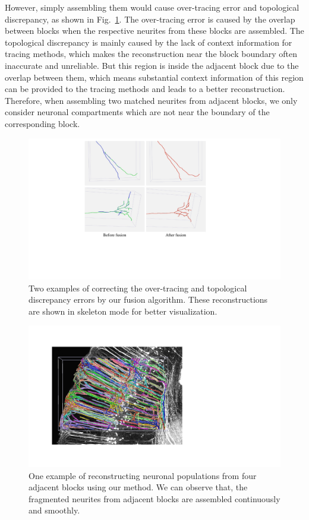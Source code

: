 However, simply assembling them would cause over-tracing error and topological discrepancy, as shown in Fig.~\ref{fig:overlap_discrepancy}.
The over-tracing error is caused by the overlap between blocks when the respective neurites from these blocks are assembled.
The topological discrepancy is mainly caused by the lack of context information for tracing methods, which makes the reconstruction near the block boundary often inaccurate and unreliable.
But this region is inside the adjacent block due to the overlap between them, which means substantial context information of this region can be provided to the tracing methods and leads to a better reconstruction.
Therefore, when assembling two matched neurites from adjacent blocks, we only consider neuronal compartments which are not near the boundary of the corresponding block. 

\begin{figure}[t]
	\centering
	\includegraphics[width=1\columnwidth]{./Illustrations/neuorns_fusion2.pdf}
	\caption{Two examples of correcting the over-tracing and topological discrepancy errors by our fusion algorithm. These reconstructions are shown in skeleton mode for better visualization.}
	\label{fig:overlap_discrepancy}
\end{figure}

\begin{figure}[t]
	\centering
	\includegraphics[width=1\columnwidth]{./Illustrations/trace_four_blocks2.pdf}
	\caption{One example of reconstructing neuronal populations from four adjacent blocks using our method. We can observe that, the fragmented neurites from adjacent blocks are assembled continuously and smoothly.}
	\label{fig:reconstruct_blocks}
\end{figure}

